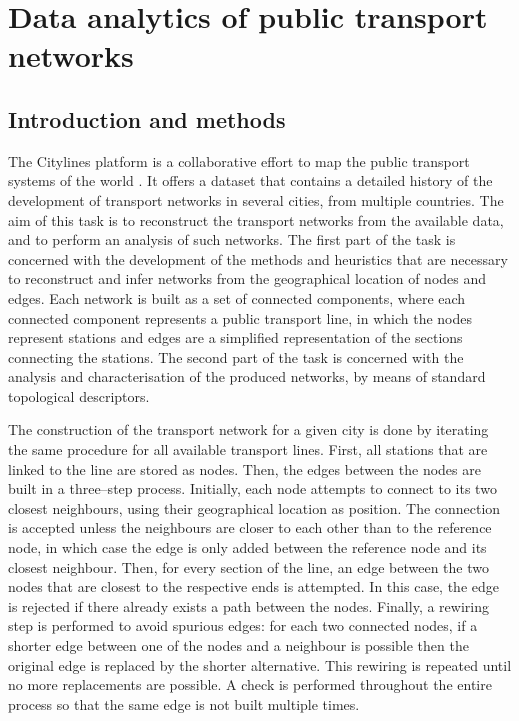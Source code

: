 \chapter{Data analytics of public transport networks}


\section{Introduction and methods}
 The Citylines platform is a collaborative effort to map the public transport systems of the world \cite{Citylines}. It offers a dataset that contains a detailed history of the development of transport networks in several cities, from multiple countries. The aim of this task is to reconstruct the transport networks from the available data, and to perform an analysis of such networks. The first part of the task is concerned with the development of the methods and heuristics that are necessary to reconstruct and infer networks from the geographical location of nodes and edges. Each network is built as a set of connected components, where each connected component represents a public transport line, in which the nodes represent stations and edges are a simplified representation of the sections connecting the stations. The second part of the task is concerned with the analysis and characterisation of the produced networks, by means of standard topological descriptors.
 
 The construction of the transport network for a given city is done by iterating the same procedure for all available transport lines. First, all stations that are linked to the line are stored as nodes. Then, the edges between the nodes are built in a three--step process. Initially, each node attempts to connect to its two closest neighbours, using their geographical location as position. The connection is accepted unless the neighbours are closer to each other than to the reference node, in which case the edge is only added between the reference node and its closest neighbour. Then, for every section of the line, an edge between the two nodes that are closest to the respective ends is attempted. In this case, the edge is rejected if there already exists a path between the nodes. Finally, a rewiring step is performed to avoid spurious edges: for each two connected nodes, if a shorter edge between one of the nodes and a neighbour is possible then the original edge is replaced by the shorter alternative. This rewiring is repeated until no more replacements are possible. A check is performed throughout the entire process so that the same edge is not built multiple times.
 
